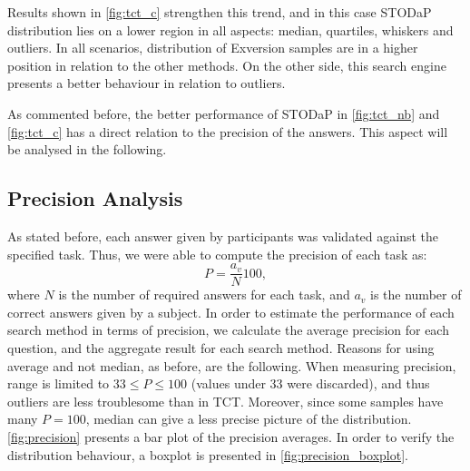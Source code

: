 Results shown in \autoref{fig:tct_c} strengthen this trend, and in this case STODaP distribution lies on a lower region in all aspects: median, quartiles, whiskers and outliers.
In all scenarios, distribution of Exversion samples are in a higher position in relation to the other methods.
On the other side, this search engine presents a better behaviour in relation to outliers.

As commented before, the better performance of STODaP in \autoref{fig:tct_nb} and \autoref{fig:tct_c} has a direct relation to the precision of the answers.
This aspect will be analysed in the following.


\subsection{Precision Analysis}


As stated before, each answer given by participants was validated against the specified task.
Thus, we were able to compute the precision of each task as:
\begin{equation}
	P = \frac{a_v}{N} 100,
\end{equation}
where $N$ is the number of required answers for each task, and $a_v$ is the number of correct answers given by a subject.
In order to estimate the performance of each search method in terms of precision, we calculate the average precision for each question, and the aggregate result for each search method.
Reasons for using average and not median, as before, are the following.
When measuring precision, range is limited to $33 \leq P \leq 100$ (values under 33 were discarded), and thus outliers are less troublesome than in TCT.
Moreover, since some samples have many $P = 100$, median can give a less precise picture of the distribution.
\autoref{fig:precision} presents a bar plot of the precision averages.
In order to verify the distribution behaviour, a boxplot is presented in \autoref{fig:precision_boxplot}.

